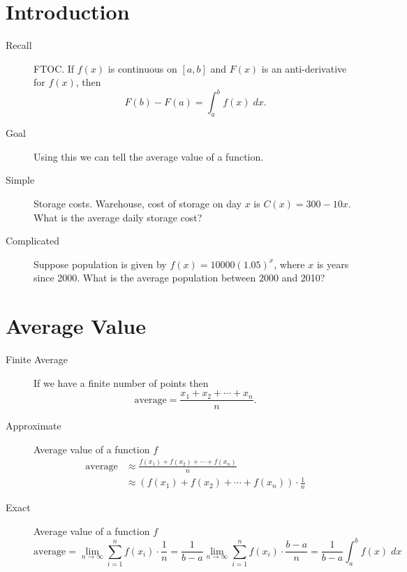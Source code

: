 \documentclass[11pt]{article}
\begin{document}
\drawtitle

\section*{Introduction}
\begin{description}

\item[Recall] FTOC.  If $f(x)$ is continuous on $[a,b]$ and $F(x)$ is
  an anti-derivative for $f(x)$, then
  \[
  F(b)-F(a)=\int_a^b f(x)\;dx.
  \]
\item[Goal] Using this we can tell the average value of a function.
\item[Simple] Storage costs.  Warehouse, cost of storage on day $x$ is
  $C(x)=300-10x$.  What is the average daily storage cost?
\item[Complicated] Suppose population is given by
  $f(x)=10000(1.05)^x$, where $x$ is years since 2000.  What is the
  average population between 2000 and 2010?
\end{description}

\section*{Average Value}

\begin{description}
\item[Finite Average] If we have a finite number of points then
  \[
  \text{average} = \frac{x_1 + x_2 + \cdots + x_n}{n}.
  \]
\item[Approximate] Average value of a function $f$
  \begin{align*}
    \text{average} &\approx \frac{f(x_1) + f(x_2) + \cdots + f(x_n)}{n}\\
    &\approx \left(f(x_1) + f(x_2) + \cdots + f(x_n)\right)\cdot\frac{1}{n}
  \end{align*}

\item[Exact] Average value of a function $f$
  \[
  \text{average} = \lim_{n\to\infty} \sum_{i=1}^n f(x_i)\cdot\frac{1}{n}
  = \frac{1}{b-a}\lim_{n\to\infty}\sum_{i=1}^n f(x_i)\cdot\frac{b-a}{n}
  = \frac{1}{b-a}\int_a^b f(x)\; dx
  \]

\end{description}
\end{document}
